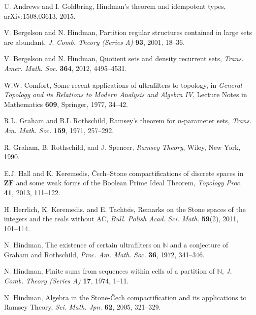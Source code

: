 \documentclass{amsart}
\theoremstyle{definition}
\theoremstyle{remark}
\def\N{\mathbb{N}}
\begin{document}
\medskip

\begin{thebibliography}{99}

U. Andrews and I. Goldbring,
Hindman's theorem and idempotent types,
 arXiv:1508.03613, 2015.

V. Bergelson and N. Hindman, 
Partition regular structures contained in large sets are abundant, 
\emph{J. Comb. Theory (Series A)} \textbf{93}, 2001, 18--36.

V. Bergelson and N. Hindman, 
Quotient sets and density recurrent sets, 
\emph{Trans. Amer. Math. Soc.} \textbf{364}, 2012, 4495--4531. 

W.W. Comfort, Some recent applications of ultrafilters to topology,
in \emph{General Topology and its Relations to Modern Analysis
and Algebra IV}, Lecture Notes in Mathematics \textbf{609},
Springer, 1977, 34--42.

R.L. Graham and B.L Rothschild,
Ramsey's theorem for $n$-parameter sets,
\emph{Trans. Am. Math. Soc.} \textbf{159}, 1971, 257--292.

R. Graham, B. Rothschild, and J. Spencer, \emph{Ramsey Theory},
Wiley, New York, 1990.


E.J. Hall and K. Keremedis, \v{C}ech--Stone compactifications
of discrete spaces in $\mathbf{ZF}$ and some weak forms of the Boolean Prime
Ideal Theorem, \emph{Topology Proc.} \textbf{41}, 2013, 111--122.

H. Herrlich, K. Keremedis, and E. Tachtsis, 
Remarks on the Stone spaces of the integers and the reals without AC, 
\emph{Bull. Polish Acad. Sci. Math.} \textbf{59}(2), 2011, 101--114.

N. Hindman, The existence of certain ultrafilters on $\N$
and a conjecture of Graham and Rothschild,
\emph{Proc. Am. Math. Soc.} \textbf{36}, 1972,  341--346.

N. Hindman, Finite sums from sequences within cells of a partition of $\N$, 
\emph{J. Comb. Theory (Series A)} \textbf{17}, 1974, 1--11.

N. Hindman, Algebra in the Stone-\v{C}ech compactification 
and its applications to Ramsey Theory,
\emph{Sci. Math. Jpn.} \textbf{62}, 2005, 321--329.


\end{thebibliography}
\end{document}
